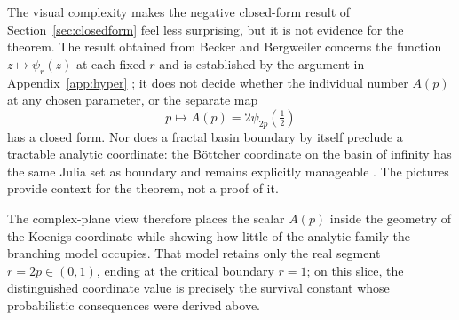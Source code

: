 \begin{samepage}
The visual complexity makes the negative closed-form result of
Section~\ref{sec:closedform} feel less surprising, but it is not evidence for
the theorem. The result obtained from Becker and Bergweiler concerns the
function $z\mapsto\psi_r(z)$ at each fixed $r$ and is established by the
argument in Appendix~\ref{app:hyper} \cite{BeckerBergweiler1995}; it does not decide whether
the individual number $A(p)$ at any chosen parameter, or the separate map
\[
p\longmapsto A(p)=2\psi_{2p}\!\left(\tfrac12\right)
\]
has a closed form. Nor does a fractal basin boundary by itself preclude a
tractable analytic coordinate: the B\"ottcher coordinate on the basin of infinity
has the same Julia set as boundary and remains explicitly manageable
\cite{Milnor2006}. The pictures provide context for the theorem, not a proof of
it.

The complex-plane view therefore places the scalar $A(p)$ inside the geometry of
the Koenigs coordinate while showing how little of the analytic family the
branching model occupies. That model retains only the real segment
$r=2p\in(0,1)$, ending at the critical boundary $r=1$; on this slice, the
distinguished coordinate value is precisely the survival constant whose
probabilistic consequences were derived above.
\end{samepage}
